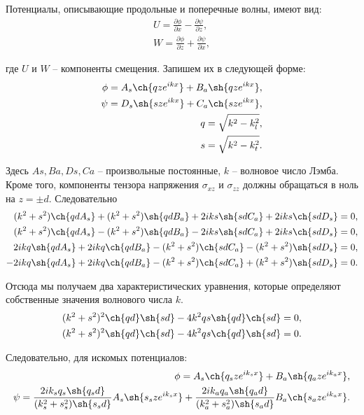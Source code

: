 Потенциалы, описывающие продольные и поперечные волны, имеют вид:
\begin{eqnarray}
U = \frac{\partial \phi}{\partial x} - \frac{\partial \psi}{\partial z}, \\
W = \frac{\partial \phi}{\partial z} + \frac{\partial \psi}{\partial x},
\end{eqnarray}

где $U$ и $W$ -- компоненты смещения. Запишем их в следующей форме:
\begin{eqnarray}
\phi = A_s \ch{qze^{ikx}} + B_a \sh{qze^{ikx}}, \\
\psi = D_s \sh{sze^{ikx}} + C_a \ch{sze^{ikx}}, \\
q = \sqrt{k^2 - k_l^2}, \\
s = \sqrt{k^2 - k_t^2}.
\end{eqnarray}

Здесь $As, Ba, Ds, Ca$ -- произвольные постоянные, $k$ -- волновое число Лэмба. Кроме того, компоненты тензора напряжения $\sigma_{xz}$ и $\sigma_{zz}$ должны обращаться в ноль на $z = \pm d$. Следовательно
\begin{eqnarray}
(k^2+s^2)\ch{qdA_s} + (k^2+s^2)\sh{qdB_a} + 2iks\sh{sdC_a} + 2iks\ch{sdD_s} = 0, \\
(k^2+s^2)\ch{qdA_s} - (k^2+s^2)\sh{qdB_a} - 2iks\sh{sdC_a} + 2iks\ch{sdD_s} = 0, \\
2ikq\sh{qdA_s} + 2ikq\ch{qdB_a} - (k^2+s^2)\ch{sdC_a} - (k^2+s^2)\sh{sdD_s} = 0, \\
-2ikq\sh{qdA_s} + 2ikq\ch{qdB_a} - (k^2+s^2)\ch{sdC_a} + (k^2+s^2)\sh{sdD_s} = 0.
\end{eqnarray}

Отсюда мы получаем два характеристических уравнения, которые определяют собственные значения волнового числа $k$.
\begin{eqnarray}
(k^2+s^2)^2\ch{qd}\sh{sd} - 4k^2qs\sh{qd}\ch{sd} = 0, \\
(k^2+s^2)^2\sh{qd}\ch{sd} - 4k^2qs\ch{qd}\sh{sd} = 0.
\end{eqnarray}

Следовательно, для искомых потенциалов:
\begin{eqnarray}
\phi = A_s\ch{q_{s}ze^{ik_{s}x}} + B_a\sh{q_{a}ze^{ik_{a}x}}, \\
\psi = \frac{ 2ik_{s}q_{s}\sh{q_{s}d} }{ (k_s^2+s_s^2)\sh{s_{s}d} } A_s\sh{s_{s}ze^{ik_{s}x}} + \frac{ 2ik_{a}q_{a}\sh{q_{a}d} }{ (k_a^2+s_a^2)\sh{s_{a}d} } B_a\ch{s_{a}ze^{ik_{a}x}}.
\end{eqnarray}

